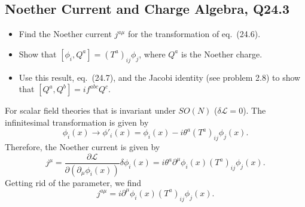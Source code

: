 \subsection{Noether Current and Charge Algebra, Q24.3}
\begin{itemize}
    \item Find the Noether current $j^{a\mu}$ for the transformation of eq.~(24.6).
    \item Show that $[\phi_i, Q^a] = (T^a)_{ij}\phi_j$, where $Q^a$ is the Noether charge.
    \item Use this result, eq.~(24.7), and the Jacobi identity (see problem 2.8) to show that $[Q^a, Q^b] = if^{abc}Q^c$.
\end{itemize}

\begin{solution}
    For scalar field theories that is invariant under $SO(N)$ ($\delta \mathcal{L} = 0$). The infinitesimal transformation is given by
    \begin{equation}
        \phi_i(x) \to \phi'_i(x) = \phi_i(x) -i\theta^a(T^a)_{ij}\phi_j(x).
    \end{equation}
    Therefore, the Noether current is given by
    \begin{equation}
        j^\mu = \frac{\partial\mathcal{L}}{\partial(\partial_\mu\phi_i(x))}\delta\phi_i(x) = i\theta^a\partial^\mu \phi_i(x)(T^a)_{ij}\phi_j(x).
    \end{equation}
    Getting rid of the parameter, we find
    \begin{equation}
        j^{a\mu} = i\partial^\mu \phi_i(x)(T^a)_{ij}\phi_j(x).
    \end{equation}


\end{solution}
